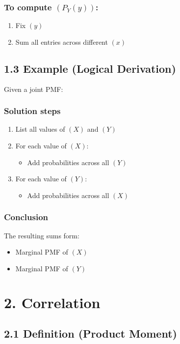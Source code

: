 \documentclass[12pt]{article}
\begin{document}
\subsubsection*{To compute $(P_Y(y))$:}
\begin{enumerate}
\item Fix $(y)$
\item Sum all entries across different $(x)$
\end{enumerate}

\subsection*{1.3 Example (Logical Derivation)}

Given a joint PMF:

\subsubsection*{Solution steps}

\begin{enumerate}
\item List all values of $(X)$ and $(Y)$
\item For each value of $(X)$:
\begin{itemize}
\item Add probabilities across all $(Y)$
\end{itemize}
\item For each value of $(Y)$:
\begin{itemize}
\item Add probabilities across all $(X)$
\end{itemize}
\end{enumerate}

\subsubsection*{Conclusion}

The resulting sums form:
\begin{itemize}
\item Marginal PMF of $(X)$
\item Marginal PMF of $(Y)$
\end{itemize}

\section*{2. Correlation}

\subsection*{2.1 Definition (Product Moment)}
\end{document}

